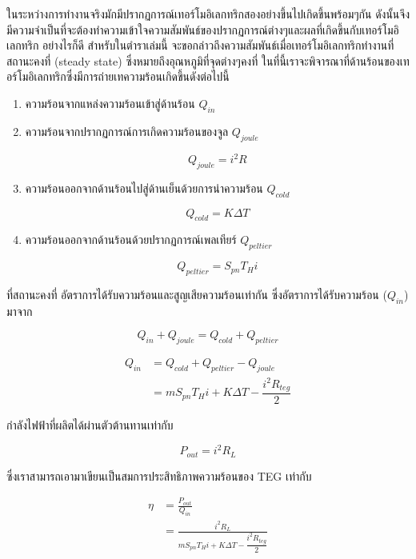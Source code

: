 \message{ !name(solar.tex)}\documentclass[
a4paper,
svgnames,
openany,
justified,
]{tufte-book}
\begin{document}
ในระหว่างการทำงานจริงมักมีปรากฏการณ์เทอร์โมอิเลกทริกสองอย่างขึ้นไปเกิดขึ้นพร้อมๆกัน ดังนั้นจึงมีความจำเป็นที่จะต้องทำความเข้าใจความสัมพันธ์ของปรากฏการณ์ต่างๆและผลที่เกิดขึ้นกับเทอร์โมอิเลกทริก อย่างไรก็ดี สำหรับในตำราเล่มนี้ จะขอกล่าวถึงความสัมพันธ์เมื่อเทอร์โมอิเลกทริกทำงานที่สถานะคงที่ (steady state) ซึ่งหมายถึงอุณหภูมิที่จุดต่างๆคงที่ ในที่นี้เราจะพิจารณาที่ด้านร้อนของเทอร์โมอิเลกทริกซึ่งมีการถ่ายเทความร้อนเกิดขึ้นดังต่อไปนี้

\begin{enumerate}
\item ความร้อนจากแหล่งความร้อนเข้าสู่ด้านร้อน $Q_{in}$
\item ความร้อนจากปรากฏการณ์การเกิดความร้อนของจูล $Q_{joule}$

  $$ Q_{joule} = i^2 R $$

\item ความร้อนออกจากด้านร้อนไปสู่ด้านเย็นด้วยการนำความร้อน $Q_{cold}$

  $$ Q_{cold} = K \Delta T $$

\item ความร้อนออกจากด้านร้อนด้วยปรากฏการณ์เพลเทียร์ $Q_{peltier}$

  $$ Q_{peltier} = S_{pn} T_H i $$
\end{enumerate}

ที่สถานะคงที่ อัตราการได้รับความร้อนและสูญเสียความร้อนเท่ากัน ซึ่งอัตราการได้รับความร้อน ($Q_{in}$) มาจาก

$$ Q_{in} + Q_{joule} = Q_{cold} + Q_{peltier}$$

\begin{equation}
\begin{aligned}
  Q_{in} &=  Q_{cold} + Q_{peltier} - Q_{joule}  \\
  &=  m S_{pn} T_H i +  K\Delta T -  \dfrac{i^2 R_{teg}}{2}
\end{aligned}
\end{equation}

กำลังไฟฟ้าที่ผลิตได้ผ่านตัวต้านทานเท่ากับ

\begin{equation}
  P_{out} = i^2 R_L
\end{equation}

ซึ่งเราสามารถเอามาเขียนเป็นสมการประสิทธิภาพความร้อนของ TEG เท่ากับ

\begin{equation}
  \label{eq: TEG thermal eff}
  \begin{aligned}
    \eta &= \frac{P_{out}}{Q_{in}} \\
    &= \frac{i^2 R_L}{ m S_{pn} T_H i + K \Delta T - \dfrac{ i^2 R_{teg}}{2}}
  \end{aligned} 
\end{equation}
\end{document}
